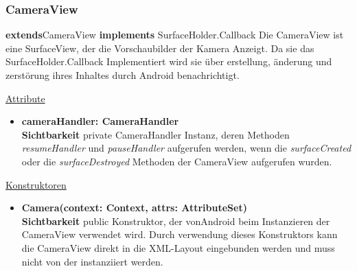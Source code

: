 \subsubsection{CameraView} \label{app:klasse:CameraView}
\textbf{extends}CameraView\newline
\textbf{implements} SurfaceHolder.Callback\newline
Die CameraView ist eine SurfaceView, der die Vorschaubilder der Kamera Anzeigt. Da sie das SurfaceHolder.Callback Implementiert wird sie über erstellung, änderung und zerstörung ihres Inhaltes durch Android benachrichtigt.
\newline

\underline{Attribute}
\begin{itemize}
\itemsep0pt
\item \textbf{cameraHandler: CameraHandler} \hfill\\ 
\textbf{Sichtbarkeit} private \newline
CameraHandler Instanz, deren Methoden \textit{resumeHandler} und \textit{pauseHandler} aufgerufen werden, wenn die \textit{surfaceCreated} oder die \textit{surfaceDestroyed} Methoden der CameraView aufgerufen wurden.

\end{itemize}

\underline{Konstruktoren}
\begin{itemize}
\itemsep0pt
\item \textbf{Camera(context: Context, attrs: AttributeSet)} \hfill\\
\textbf{Sichtbarkeit} public\newline
Konstruktor, der vonAndroid beim Instanzieren der CameraView verwendet wird. Durch verwendung dieses Konstruktors kann die CameraView direkt in die XML-Layout eingebunden werden und muss nicht von der  instanziiert werden. 
\end{itemize}

